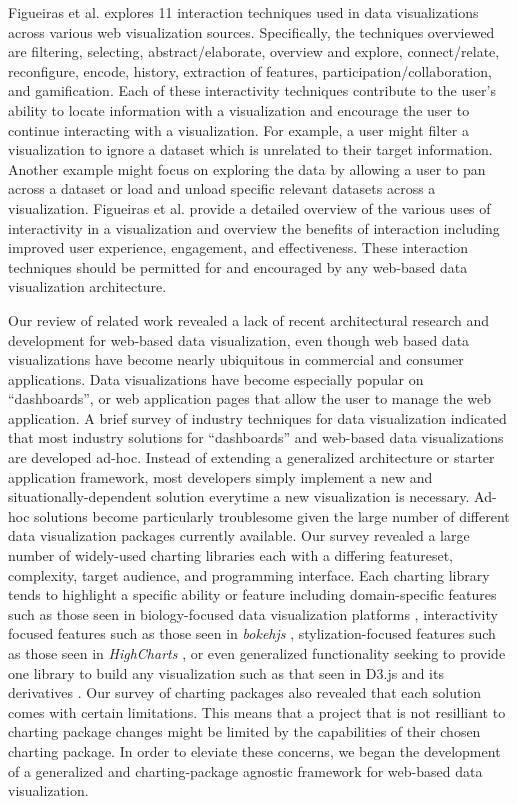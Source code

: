 Figueiras et al. \cite{interaction} explores 11 interaction techniques used in data visualizations across various web visualization sources.  Specifically, the techniques overviewed are filtering, selecting, abstract/elaborate, overview and explore, connect/relate, reconfigure, encode, history, extraction of features, participation/collaboration, and gamification. Each of these interactivity techniques contribute to the user’s ability to locate information with a visualization and encourage the user to continue interacting with a visualization.  For example, a user might filter a visualization to ignore a dataset which is unrelated to their target information.  Another example might focus on exploring the data by allowing a user to pan across a dataset or load and unload specific relevant datasets across a visualization.  Figueiras et al. provide a detailed overview of the various uses of interactivity in a visualization and overview the benefits of interaction including improved user experience, engagement, and effectiveness.  These interaction techniques should be permitted for and encouraged by any web-based data visualization architecture. \par
Our review of related work revealed a lack of recent architectural research and development for web-based data visualization, even though web based data visualizations have become nearly ubiquitous in commercial and consumer applications.  Data visualizations have become especially popular on ``dashboards'', or web application pages that allow the user to manage the web application.  A brief survey of industry techniques for data visualization indicated that most industry solutions for ``dashboards'' and web-based data visualizations are developed ad-hoc.  Instead of extending a generalized architecture or starter application framework, most developers simply implement a new and situationally-dependent solution everytime a new visualization is necessary.  Ad-hoc solutions become particularly troublesome given the large number of different data visualization packages currently available.  Our survey revealed a large number of widely-used charting libraries each with a differing featureset, complexity, target audience, and programming interface.  Each charting library tends to highlight a specific ability or feature including domain-specific features such as those seen in biology-focused data visualization platforms \cite{biojs}, interactivity focused features such as those seen in \textit{bokehjs}
\cite{bokehjs}, stylization-focused features such as those seen in \textit{HighCharts} \cite{highcharts}, or even generalized functionality seeking to provide one library to build any visualization such as that seen in D3.js and its derivatives \cite{d3homepage}.  Our survey of charting packages also revealed that each solution comes with certain limitations.  This means that a project that is not resilliant to charting package changes might be limited by the capabilities of their chosen charting package.  In order to eleviate these concerns, we began the development of a generalized and charting-package agnostic framework for web-based data visualization.
